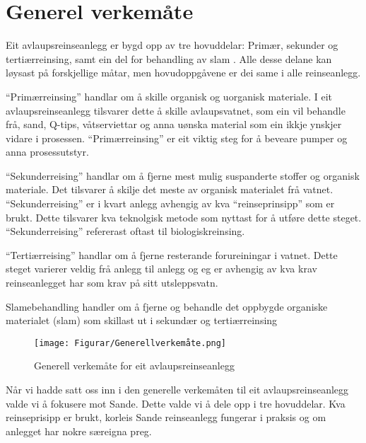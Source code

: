 \section{Generel verkemåte}

Eit avlaupsreinseanlegg er bygd opp av tre hovuddelar: Primær, sekunder og tertiærreinsing,
samt ein del for behandling av slam \citep{Regjeriga}.
Alle desse delane kan løysast på forskjellige måtar, men hovudoppgåvene er dei same
i alle reinseanlegg.

``Primærreinsing'' handlar om å skille organisk og uorganisk materiale.
I eit avlaupsreinseanlegg tilsvarer dette å skille avlaupsvatnet, 
som ein vil behandle frå, sand, Q-tips, våtserviettar
og anna uønska material som ein ikkje ynskjer vidare i prosessen.\newline
``Primærreinsing'' er eit viktig steg for å beveare pumper og anna prosessutstyr.

``Sekunderreising'' handlar om å fjerne mest mulig suspanderte stoffer og organisk materiale.
Det tilsvarer å skilje det meste av organisk materialet frå vatnet.
``Sekunderreising'' er i kvart anlegg avhengig av kva ``reinseprinsipp'' som er brukt. Dette tilsvarer
kva teknolgisk metode som nyttast for å utføre dette steget.
``Sekunderreising'' refererast oftast til biologiskreinsing.

``Tertiærreising'' handlar om å fjerne resterande forureiningar i vatnet.
Dette steget varierer veldig frå anlegg til anlegg og eg er
avhengig av kva krav reinseanlegget har som krav på sitt utsleppsvatn.

Slamebehandling handler om å fjerne og behandle det oppbygde organiske materialet (slam)
som skillast ut i sekundær og tertiærreinsing 

\begin{figure}[htbp]
    \centering
    \texttt{[image: Figurar/Generellverkemåte.png]}
    \caption{Generell verkemåte for eit avlaupsreinseanlegg}\label{fig:GenerellVerkemåte}
\end{figure}

Når vi hadde satt oss inn i den generelle verkemåten til eit avlaupsreinseanlegg
valde vi å fokusere mot Sande.
Dette valde vi å dele opp i tre hovuddelar. Kva reinseprisipp er brukt, korleis Sande reinseanlegg
fungerar i praksis og om anlegget har nokre særeigna preg.
